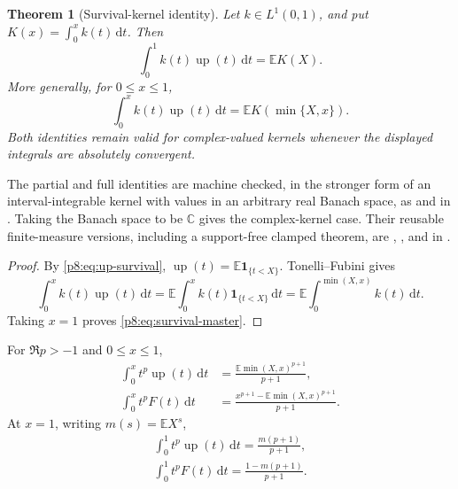 \documentclass[11pt,oneside]{article}
\newtheorem{theorem}{Theorem}[section]
\theoremstyle{definition}
\theoremstyle{remark}
\newcommand{\Up}{\operatorname{up}}
\newcommand{\E}{\mathbb E}
\newcommand{\C}{\mathbb C}
\newcommand{\dd}{\,\mathrm d}
\newcommand{\1}{\mathbf 1}
\begin{document}
\begin{theorem}[Survival-kernel identity]
\label{p8:thm:survival-kernel}
Let \(k\in L^1(0,1)\), and put \(K(x)=\int_0^x k(t)\dd t\).  Then
\begin{equation}
 \boxed{\int_0^1 k(t)\Up(t)\dd t=\E K(X).}
 \label{p8:eq:survival-master}
\end{equation}
More generally, for \(0\le x\le1\),
\begin{equation}
 \boxed{\int_0^x k(t)\Up(t)\dd t
 =\E K(\min\{X,x\}).}
 \label{p8:eq:survival-partial}
\end{equation}
Both identities remain valid for complex-valued kernels whenever the displayed
integrals are absolutely convergent.  \statusprovedPartll
\end{theorem}

\begin{statusbox}
The partial and full identities are machine checked, in the stronger form of an
interval-integrable kernel with values in an arbitrary real Banach space, as
and
in .  Taking the Banach space to be \(\C\)
gives the complex-kernel case.  Their reusable finite-measure versions, including a
support-free clamped theorem, are
,
, and
 in
.
\end{statusbox}

\begin{proof}
By \eqref{p8:eq:up-survival},
\(\Up(t)=\E\mathbf1_{\{t<X\}}\).  Tonelli--Fubini gives
\[
 \int_0^x k(t)\Up(t)\dd t
 =\E\int_0^x k(t)\mathbf1_{\{t<X\}}\dd t
 =\E\int_0^{\min(X,x)}k(t)\dd t.
\]
Taking \(x=1\) proves \eqref{p8:eq:survival-master}.
\end{proof}

\begin{corollary}
\label{p8:cor:monomial-partial}
For \(\Re p>-1\) and \(0\le x\le1\),
\begin{align}
 \int_0^x t^p\Up(t)\dd t
 &=\frac{\E\min(X,x)^{p+1}}{p+1},
 \label{p8:eq:up-monomial-partial}\\
 \int_0^x t^pF(t)\dd t
 &=\frac{x^{p+1}-\E\min(X,x)^{p+1}}{p+1}.
 \label{p8:eq:F-monomial-partial}
\end{align}
At \(x=1\), writing \(m(s)=\E X^s\),
\begin{align}
 \boxed{\int_0^1t^p\Up(t)\dd t=\frac{m(p+1)}{p+1},}
 \label{p8:eq:up-monomial-full}\\
 \boxed{\int_0^1t^pF(t)\dd t=\frac{1-m(p+1)}{p+1}.}
 \label{p8:eq:F-monomial-full}
\end{align}
\statusprovedPartll
\end{corollary}
\end{document}
